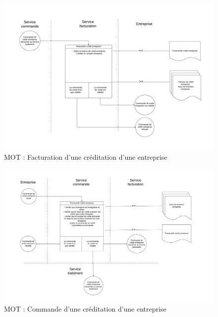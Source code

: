 \begin{landscape}
  \begin{figure}[ht!]
      \centering
      \includegraphics[width=0.7\paperheight]{mot-facturation-credit-entreprise}
      \caption{MOT : Facturation d'une créditation d'une entreprise}
      \label{fig:mot-facturation-credit-entreprise}
  \end{figure}
\end{landscape}

\begin{landscape}
  \begin{figure}[ht!]
      \centering
      \includegraphics[width=0.7\paperheight]{mot-commande-credit-entreprise}
      \caption{MOT : Commande d'une créditation d'une entreprise}
      \label{fig:mot-commande-credit-entreprise}
  \end{figure}
\end{landscape}

